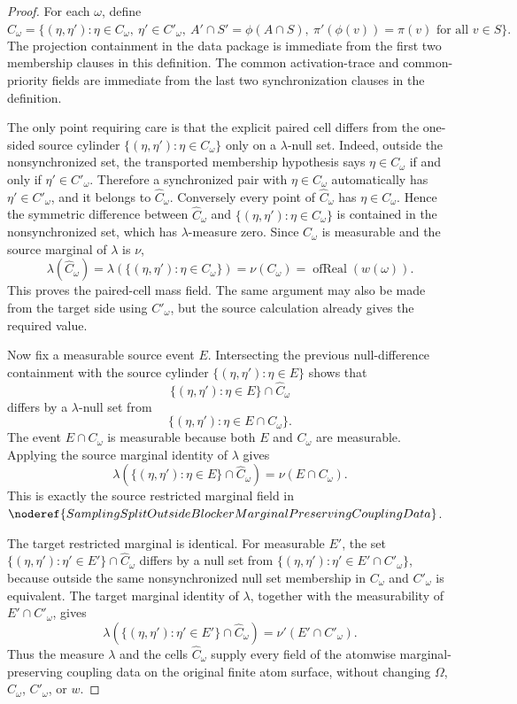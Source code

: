 \begin{proof}
For each \(\omega\), define
\[
  \widehat C_\omega
  =\{(\eta,\eta'):\eta\in C_\omega,\ \eta'\in C'_\omega,\
      A'\cap S'=\phi(A\cap S),\
      \pi'(\phi(v))=\pi(v)\text{ for all }v\in S\}.
\]
The projection containment in the data package is immediate from the first
two membership clauses in this definition.  The common activation-trace and
common-priority fields are immediate from the last two synchronization
clauses in the definition.

The only point requiring care is that the explicit paired cell differs from
the one-sided source cylinder \(\{(\eta,\eta'):\eta\in C_\omega\}\) only on a
\(\lambda\)-null set.  Indeed, outside the nonsynchronized set, the
transported membership hypothesis says
\(\eta\in C_\omega\) if and only if \(\eta'\in C'_\omega\).  Therefore a
synchronized pair with \(\eta\in C_\omega\) automatically has
\(\eta'\in C'_\omega\), and it belongs to \(\widehat C_\omega\).  Conversely
every point of \(\widehat C_\omega\) has \(\eta\in C_\omega\).  Hence the
symmetric difference between
\(\widehat C_\omega\) and
\(\{(\eta,\eta'):\eta\in C_\omega\}\) is contained in the nonsynchronized
set, which has \(\lambda\)-measure zero.  Since \(C_\omega\) is measurable and
the source marginal of \(\lambda\) is \(\nu\),
\[
  \lambda(\widehat C_\omega)
  =\lambda(\{(\eta,\eta'):\eta\in C_\omega\})
  =\nu(C_\omega)
  =\operatorname{ofReal}(w(\omega)).
\]
This proves the paired-cell mass field.  The same argument may also be made
from the target side using \(C'_\omega\), but the source calculation already
gives the required value.

Now fix a measurable source event \(E\).  Intersecting the previous
null-difference containment with the source cylinder
\(\{(\eta,\eta'):\eta\in E\}\) shows that
\[
  \{(\eta,\eta'):\eta\in E\}\cap\widehat C_\omega
\]
differs by a \(\lambda\)-null set from
\[
  \{(\eta,\eta'):\eta\in E\cap C_\omega\}.
\]
The event \(E\cap C_\omega\) is measurable because both \(E\) and
\(C_\omega\) are measurable.  Applying the source marginal identity of
\(\lambda\) gives
\[
  \lambda(\{(\eta,\eta'):\eta\in E\}\cap\widehat C_\omega)
  =\nu(E\cap C_\omega).
\]
This is exactly the source restricted marginal field in
\(\noderef{SamplingSplitOutsideBlockerMarginalPreservingCouplingData}\).

The target restricted marginal is identical.  For measurable \(E'\), the set
\(\{(\eta,\eta'):\eta'\in E'\}\cap\widehat C_\omega\) differs by a null set
from \(\{(\eta,\eta'):\eta'\in E'\cap C'_\omega\}\), because outside the same
nonsynchronized null set membership in \(C_\omega\) and \(C'_\omega\) is
equivalent.  The target marginal identity of \(\lambda\), together with the
measurability of \(E'\cap C'_\omega\), gives
\[
  \lambda(\{(\eta,\eta'):\eta'\in E'\}\cap\widehat C_\omega)
  =\nu'(E'\cap C'_\omega).
\]
Thus the measure \(\lambda\) and the cells \(\widehat C_\omega\) supply every
field of the atomwise marginal-preserving coupling data on the original
finite atom surface, without changing \(\Omega\), \(C_\omega\), \(C'_\omega\),
or \(w\).
\end{proof}

